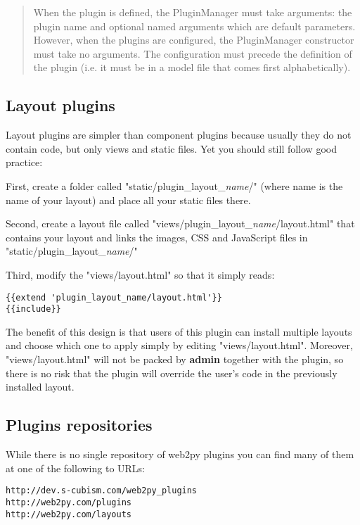 \documentclass[justified,sixbynine,notoc]{tufte-book}
\def\inxx#1{\index{#1}}
\begin{document}
\begin{fullwidth}
\begin{quote}When the plugin is defined, the PluginManager must take arguments: the plugin name and optional named arguments which are default parameters. However, when the plugins are configured, the PluginManager constructor must take no arguments. The configuration must precede the definition of the plugin (i.e. it must be in a model file that comes first alphabetically).\end{quote}
\goodbreak\subsection{Layout plugins}

\inxx{layout plugin}

Layout plugins are simpler than component plugins because usually they do not contain code, but only views and static files. Yet you should still follow  good practice:

First, create a folder called "static/plugin\_layout\_{\it name}/" (where name is the name of your layout) and place all your static files there.

Second, create a layout file called "views/plugin\_layout\_{\it name}/layout.html" that contains your layout and links the images, CSS and JavaScript files in "static/plugin\_layout\_{\it name}/"

Third, modify the "views/layout.html" so that it simply reads:

\begin{lstlisting}[keywords={}]
{{extend 'plugin_layout_name/layout.html'}}
{{include}}
\end{lstlisting}

The benefit of this design is that users of this plugin can install multiple layouts and choose which one to apply simply by editing "views/layout.html". Moreover, "views/layout.html" will not be packed by {\bf admin} together with the plugin, so there is no risk that the plugin will override the user's code in the previously installed layout.

\goodbreak\subsection{Plugins repositories}

While there is no single repository of web2py plugins you can find many of them at one of the following to URLs:

\begin{lstlisting}[keywords={}]
http://dev.s-cubism.com/web2py_plugins
http://web2py.com/plugins
http://web2py.com/layouts
\end{lstlisting}


\end{fullwidth}
\end{document}
